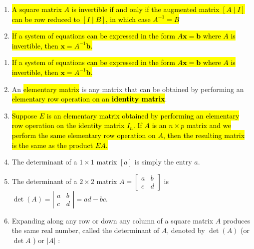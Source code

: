 \documentclass[10pt]{article}
\begin{document}
\begin{enumerate}
\item \hl{A square matrix $A$ is invertible if and only if the augmented matrix $[A \mid I]$ can be row reduced to $[I \mid B]$, in which case $A^{-1}=B$}

\item \hl{If a system of equations can be expressed in the form $A \mathbf{x}=\mathbf{b}$ where $A$ is invertible, then $\mathbf{x}=A^{-1} \mathbf{b}$.}

\end{enumerate}



\newpage

\begin{enumerate}
\section{W8}
\item \hl{If a system of equations can be expressed in the form $A \mathbf{x}=\mathbf{b}$ where $A$ is invertible, then $\mathbf{x}=A^{-1} \mathbf{b}$.}

\item An \hl{elementary matrix} is any matrix that can be obtained by performing an \hl{elementary row operation on an \textbf{identity matrix}}.

\item \hl{Suppose $E$ is an elementary matrix obtained by performing an elementary row operation on the identity matrix $I_{n}$. If $A$ is an $n \times p$ matrix and we perform the same elementary row operation on $A$, then the resulting matrix is the same as the product $E A$.}

\item The determinant of a $1 \times 1$ matrix $[a]$ is simply the entry $a$.

\item The determinant of a $2 \times 2$ matrix $A=\left[\begin{array}{ll}a & b \\ c & d\end{array}\right]$ is $\operatorname{det}(A)=\left|\begin{array}{ll}a & b \\ c & d\end{array}\right|=a d-b c$.

\item Expanding along any row or down any column of a square matrix $A$ produces the same real number, called the determinant of $A$, denoted by $\operatorname{det}(A)$ (or $\operatorname{det} A$ ) or $|A|$ :


\end{enumerate}
\end{document}

